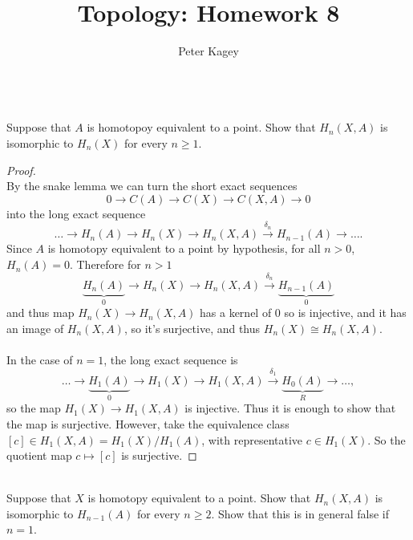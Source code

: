 \documentclass{article}
\newenvironment{problem}[2][Problem]{\begin{trivlist}
\item[\hskip \labelsep {\bfseries #1}\hskip \labelsep {\bfseries #2.}]}{\end{trivlist}}
\newcommand{\ra}{\rightarrow}
\begin{document}
\title{Topology: Homework 8}
\author{Peter Kagey}

\maketitle

\begin{problem}{1} \text{} \\
  Suppose that $A$ is homotopoy equivalent to a point. Show that $H_n(X,A)$
  is isomorphic to $H_n(X)$ for every $n \geq 1$.
\end{problem}

\begin{proof} \text{} \\
  By the snake lemma we can turn the short exact sequences \[
    0 \ra C(A) \ra C(X) \ra C(X,A) \ra 0
  \] into the long exact sequence \[
    \hdots \ra H_n(A) \ra H_n(X) \ra H_n(X,A) \xrightarrow{\delta_n} H_{n-1}(A) \ra \hdots.
  \]
  Since $A$ is homotopy equivalent to a point by hypothesis, for all $n > 0$,
  $H_n(A) = 0$.
  Therefore for $n > 1$ \[
    \underbrace{H_n(A)}_0 \ra H_n(X) \ra H_n(X,A) \xrightarrow{\delta_n} \underbrace{H_{n-1}(A)}_0
  \] and thus map $H_n(X) \ra H_n(X,A)$ has a kernel of $0$ so is injective, and it
  has an image of $H_n(X,A)$, so it's surjective, and thus $H_n(X) \cong H_n(X,A)$.
  \\~\\
  In the case of $n = 1$, the long exact sequence is \[
    \hdots \ra
    \underbrace{H_1(A)}_0 \ra H_1(X) \ra H_1(X,A) \xrightarrow{\delta_1} \underbrace{H_0(A)}_R \ra \hdots,
  \]
  so the map $H_1(X) \rightarrow H_1(X, A)$ is injective. Thus it is enough to
  show that the map is surjective. However, take the equivalence class
  $[c] \in H_1(X, A) = H_1(X)/H_1(A)$, with representative $c \in H_1(X)$.
  So the quotient map $c \mapsto [c]$ is surjective.
\end{proof}
\pagebreak
\begin{problem}{2} \text{} \\
  Suppose that $X$ is homotopy equivalent to a point. Show that $H_n(X,A)$ is
  isomorphic to $H_{n-1}(A)$ for every $n \geq 2$. Show that this is in general
  false if $n = 1$.
\end{problem}
\end{document}
